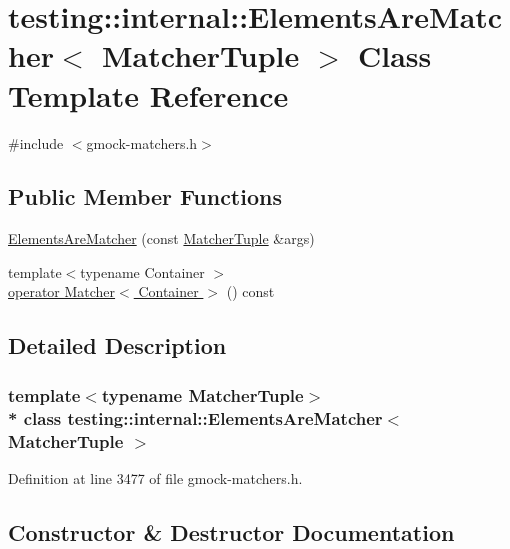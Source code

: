\hypertarget{classtesting_1_1internal_1_1_elements_are_matcher}{}\section{testing\+:\+:internal\+:\+:Elements\+Are\+Matcher$<$ Matcher\+Tuple $>$ Class Template Reference}
\label{classtesting_1_1internal_1_1_elements_are_matcher}


{\ttfamily \#include $<$gmock-\/matchers.\+h$>$}

\subsection*{Public Member Functions}
\begin{DoxyCompactItemize}
\item 
\hyperlink{classtesting_1_1internal_1_1_elements_are_matcher_a563d71088c4909ab46987e3cd28f2ad6}{Elements\+Are\+Matcher} (const \hyperlink{structtesting_1_1internal_1_1_matcher_tuple}{Matcher\+Tuple} \&args)
\item 
{\footnotesize template$<$typename Container $>$ }\\\hyperlink{classtesting_1_1internal_1_1_elements_are_matcher_ab1a065a1e66605a35035cdfc84220889}{operator Matcher$<$ Container $>$} () const 
\end{DoxyCompactItemize}


\subsection{Detailed Description}
\subsubsection*{template$<$typename Matcher\+Tuple$>$\\*
class testing\+::internal\+::\+Elements\+Are\+Matcher$<$ Matcher\+Tuple $>$}



Definition at line 3477 of file gmock-\/matchers.\+h.



\subsection{Constructor \& Destructor Documentation}
